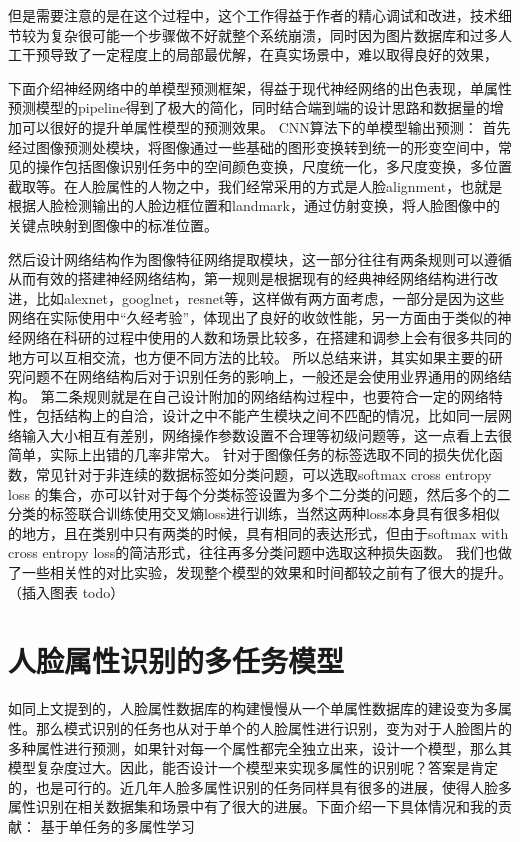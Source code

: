 但是需要注意的是在这个过程中，这个工作得益于作者的精心调试和改进，技术细节较为复杂很可能一个步骤做不好就整个系统崩溃，同时因为图片数据库和过多人工干预导致了一定程度上的局部最优解，在真实场景中，难以取得良好的效果，

下面介绍神经网络中的单模型预测框架，得益于现代神经网络的出色表现，单属性预测模型的pipeline得到了极大的简化，同时结合端到端的设计思路和数据量的增加可以很好的提升单属性模型的预测效果。
CNN算法下的单模型输出预测：
首先经过图像预测处模块，将图像通过一些基础的图形变换转到统一的形变空间中，常见的操作包括图像识别任务中的空间颜色变换，尺度统一化，多尺度变换，多位置截取等。在人脸属性的人物之中，我们经常采用的方式是人脸alignment，也就是根据人脸检测输出的人脸边框位置和landmark，通过仿射变换，将人脸图像中的关键点映射到图像中的标准位置。

然后设计网络结构作为图像特征网络提取模块，这一部分往往有两条规则可以遵循从而有效的搭建神经网络结构，第一规则是根据现有的经典神经网络结构进行改进，比如alexnet，googlnet，resnet等，这样做有两方面考虑，一部分是因为这些网络在实际使用中“久经考验”，体现出了良好的收敛性能，另一方面由于类似的神经网络在科研的过程中使用的人数和场景比较多，在搭建和调参上会有很多共同的地方可以互相交流，也方便不同方法的比较。
所以总结来讲，其实如果主要的研究问题不在网络结构后对于识别任务的影响上，一般还是会使用业界通用的网络结构。
第二条规则就是在自己设计附加的网络结构过程中，也要符合一定的网络特性，包括结构上的自洽，设计之中不能产生模块之间不匹配的情况，比如同一层网络输入大小相互有差别，网络操作参数设置不合理等初级问题等，这一点看上去很简单，实际上出错的几率非常大。
针对于图像任务的标签选取不同的损失优化函数，常见针对于非连续的数据标签如分类问题，可以选取softmax cross entropy loss	的集合，亦可以针对于每个分类标签设置为多个二分类的问题，然后多个的二分类的标签联合训练使用交叉熵loss进行训练，当然这两种loss本身具有很多相似的地方，且在类别中只有两类的时候，具有相同的表达形式，但由于softmax with cross entropy loss的简洁形式，往往再多分类问题中选取这种损失函数。
我们也做了一些相关性的对比实验，发现整个模型的效果和时间都较之前有了很大的提升。
（插入图表 todo）

\section{人脸属性识别的多任务模型}
如同上文提到的，人脸属性数据库的构建慢慢从一个单属性数据库的建设变为多属性。那么模式识别的任务也从对于单个的人脸属性进行识别，变为对于人脸图片的多种属性进行预测，如果针对每一个属性都完全独立出来，设计一个模型，那么其模型复杂度过大。因此，能否设计一个模型来实现多属性的识别呢？答案是肯定的，也是可行的。近几年人脸多属性识别的任务同样具有很多的进展，使得人脸多属性识别在相关数据集和场景中有了很大的进展。下面介绍一下具体情况和我的贡献：
基于单任务的多属性学习

